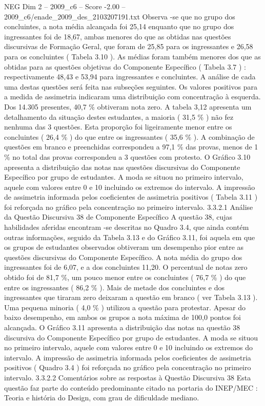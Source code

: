 \begin{textsample}{NEG Dim 2 – 2009\_c6 – Score -2.00 – 2009\_c6/enade\_2009\_des\_2103207191.txt}
Observa -se que no grupo dos concluintes, a nota média alcançada foi 25,14 enquanto que no grupo dos ingressantes foi de 18,67, ambas menores do que as obtidas nas questões discursivas de Formação Geral, que foram de 25,85 para os ingressantes e 26,58 para os concluintes ( Tabela 3.10 ).
As médias foram também menores dos que as obtidas para as questões objetivas do Componente Específico ( Tabela 3.7 ) : respectivamente 48,43 e 53,94 para ingressantes e concluintes.
A análise de cada uma destas questões será feita nas subseções seguintes.
Os valores positivos para a medida de assimetria indicaram uma distribuição com concentração à esquerda.
Dos 14.305 presentes, 40,7 \% obtiveram nota zero.
A tabela 3,12 apresenta um detalhamento da situação destes estudantes, a maioria ( 31,5 \% ) não fez nenhuma das 3 questões.
Esta proporção foi ligeiramente menor entre os concluintes ( 26,4 \% ) do que entre os ingressantes ( 35,6 \% ).
A combinação de questões em branco e preenchidas correspondeu a 97,1 \% das provas, menos de 1 \% no total das provas correspondeu a 3 questões com protesto.
O Gráfico 3.10 apresenta a distribuição das notas nas questões discursivas do Componente Específico por grupo de estudantes.
A moda se situou no primeiro intervalo, aquele com valores entre 0 e 10 incluindo os extremos do intervalo.
A impressão de assimetria informada pelos coeficientes de assimetria positivos ( Tabela 3.11 ) foi reforçada no gráfico pela concentração no primeiro intervalo. 3.3.2.1 Análise da Questão Discursiva 38 de Componente Específico A questão 38, cujas habilidades aferidas encontram -se descritas no Quadro 3.4, que ainda contém outras informações, seguido da Tabela 3.13 e do Gráfico 3.11, foi aquela em que os grupos de estudantes observados obtiveram um desempenho pior entre as questões discursivas do Componente Específico.
A nota média do grupo dos ingressantes foi de 6,07, e a dos concluintes 11,20.
O percentual de notas zero obtido foi de 81,7 \%, um pouco menor entre os concluintes ( 76,7 \% ) do que entre os ingressantes ( 86,2 \% ).
Mais de metade dos concluintes e dos ingressantes que tiraram zero deixaram a questão em branco ( ver Tabela 3.13 ).
Uma pequena minoria ( 4,0 \% ) utilizou a questão para protestar.
Apesar do baixo desempenho, em ambos os grupos a nota máxima de 100,0 pontos foi alcançada.
O Gráfico 3.11 apresenta a distribuição das notas na questão 38 discursiva do Componente Específico por grupo de estudantes.
A moda se situou no primeiro intervalo, aquele com valores entre 0 e 10 incluindo os extremos do intervalo.
A impressão de assimetria informada pelos coeficientes de assimetria positivos ( Quadro 3.4 ) foi reforçada no gráfico pela concentração no primeiro intervalo. 3.3.2.2 Comentários sobre as respostas à Questão Discursiva 38 Esta questão faz parte do conteúdo predominante citado na portaria do INEP/MEC : Teoria e história do Design, com grau de dificuldade mediano.

\end{textsample}

